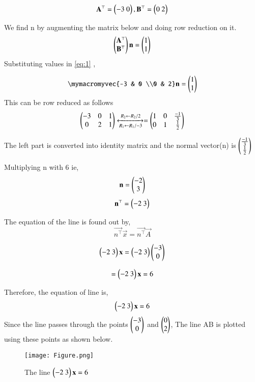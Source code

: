 \documentclass[journal,12pt,twocolumn]{IEEEtran}
\begin{document}
\begin{equation}
 \mathbf{A^\top}=\begin{pmatrix}-3 \ 0\end{pmatrix} ,  \mathbf{B^\top}=\begin{pmatrix}0 \ 2\end{pmatrix}
\end{equation}

We find n by augmenting the matrix below and doing row reduction on it.
\begin{align}
\begin{pmatrix}\mathbf{A^\top} \\ \mathbf{B^\top}\end{pmatrix}\mathbf{n} = \begin{pmatrix}1\\1\end{pmatrix}\label{eq:1}
\end{align}
Substituting values in \ref{eq:1} ,

 \begin{equation}
\mymacromyvec{-3 & 0 \\0 & 2}\vec{n}
=
\myvec{1\\1}
\end{equation}
This can be row reduced as follows
\begin{equation}
\begin{pmatrix}-3 & 0 & 1\\0 & 2 & 1\end{pmatrix} 
\xleftrightarrow [R_1\leftarrow R_1/-3]{R_2\leftarrow R_2/2}
=
\begin{pmatrix}1 & 0 & \frac{-1}{3}\\0 & 1 & \frac{1}{2}\end{pmatrix}
\end{equation}

The left part is converted into identity matrix and the normal vector(n) is $\begin{pmatrix}\frac{-1}{3}\\\frac{1}{2}\end{pmatrix}$

Multiplying n with 6 
ie,\\
\begin{equation}
    \mathbf{n} = \begin{pmatrix}{-2}\\ {3}\end{pmatrix}
\end{equation}
\begin{equation}
\mathbf{n^\top}  = \begin{pmatrix}{-2}\ {3}\end{pmatrix}
      \end{equation} 


The equation of the line is found out by,
\begin{equation}
\vec{n^\top}\vec{x} = \vec{n^\top}\vec{A}
\end{equation}

\begin{equation}
\myvec{{-2}\ {3}}\vec{x} =  \myvec{{-2}\ {3}}\myvec{-3 \\ 0}
\end{equation}

\begin{equation}
= \begin{pmatrix}{-2}\ {3}\end{pmatrix}\mathbf{x} = 6
\end{equation}

 Therefore, the equation of line is,
\begin{equation}
   \begin{pmatrix}{-2}\ {3}\end{pmatrix}\mathbf{x} = 6
\end{equation}
\cleardoublepage
Since the line passes through the points $\begin{pmatrix}-3\\0\end{pmatrix}$ and $\begin{pmatrix}0\\2\end{pmatrix}$, The line AB is plotted using these points as shown below.


\begin{figure}[!h]
         \centering
         \texttt{[image: Figure.png]}
         \caption{The line $\begin{pmatrix}{-2}\ {3}\end{pmatrix}\mathbf{x} = 6$ }
         \label{Figure}
\end{figure}
\end{document}
